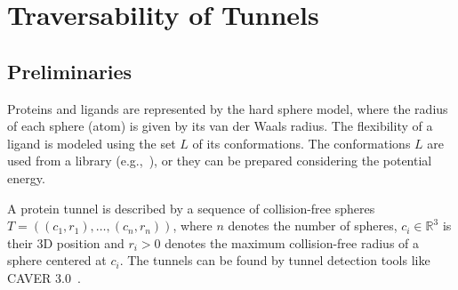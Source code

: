 \documentclass[letterpaper, 10 pt, conference]{ieeeconf} %
\def\R{\mathbb{R}}
\def\L{L}
\begin{document}
\section{Traversability of Tunnels}

\subsection{Preliminaries}

Proteins and ligands are represented by the hard sphere model, where the radius of each sphere (atom) is given by its van der Waals radius.
The flexibility of a ligand is modeled using the set $\L$ of its conformations.
The conformations $L$ are used from a library (e.g.,~\cite{dunbrack}), or they can be prepared considering the potential energy.



A protein tunnel is described by a sequence of collision-free spheres 
$T=( (c_1, r_1),\ldots,(c_n,r_n) )$, where $n$ denotes the number of spheres,
$c_i \in \R^3$ is their 3D position and $r_i > 0$ denotes the maximum collision-free radius of a sphere centered at $c_i$. 
The tunnels can be found by tunnel detection tools like CAVER 3.0~\cite{caver3}.


\end{document}

